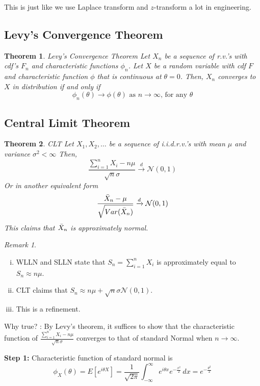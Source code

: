 \documentclass[11pt]{article}
\newtheorem{theorem}{Theorem}[section]
\theoremstyle{definition}
\theoremstyle{remark}
\newtheorem*{remark}{Remark}
\begin{document}
    This is just like we use Laplace transform and $z$-transform a lot in engineering.

\subsection{Levy's Convergence Theorem}
    \begin{theorem}{Levy's Convergence Theorem}
        Let ${X_n}$ be a sequence of r.v.’s with cdf’s $F_n$ and characteristic functions $\phi_n$. Let $X$ be a random variable with cdf $F$ and characteristic function $\phi$ that is continuous at $\theta = 0$. Then, $X_n$ converges to $X$ in distribution if and only if
        $$\phi_n(\theta) \rightarrow \phi(\theta) \text{ as } n \rightarrow \infty \text{, for any } \theta$$
    \end{theorem}
\subsection{Central Limit Theorem}
    \begin{theorem}{CLT}
        Let $X_1,X_2, \dots$ be a sequence of i.i.d.r.v.’s with mean $\mu$ and variance $\sigma^2 < \infty$ Then, 
        $$\frac{\sum_{i=1}^{n} X_i -n\mu}{\sqrt{n}\sigma} \xrightarrow[]{d} \mathcal{N}(0,1)$$
        Or in another equivalent form
        $$\frac{\Bar{X}_n - \mu}{\sqrt{Var(\Bar{X}_n)}} \xrightarrow[]{d} \mathcal{N}(0,1)$$
        This claims that $\Bar{X}_n$ is approximately normal.
    \end{theorem}
    \begin{remark}
    \begin{enumerate}[(i)]
        \item WLLN and SLLN state that $S_n = \sum_{i=1}^n X_i$ is approximately equal to $S_n \approx n\mu$.
        \item CLT claims that $S_n \approx n\mu + \sqrt{n}\sigma \mathcal{N}(0,1)$.
        \item This is a refinement.
    \end{enumerate}
    \end{remark}
    Why true?
    \proofname: By Levy's theorem, it suffices to show that the characteristic function of $\frac{\sum_{i=1}^{n} X_i -n\mu}{\sqrt{n}\sigma}$ converges to that of standard Normal when $n \rightarrow \infty$.

    \textbf{Step 1: } Characteristic function of standard normal is 
    $$\phi_X(\theta) = E[e^{i\theta X}] = \frac{1}{\sqrt{2\pi}}\int_{-\infty}^\infty e^{i\theta x} e^{- \frac{x^2}{2}}\,dx = e^{-\frac{\theta^2}{2}}$$
\end{document}

